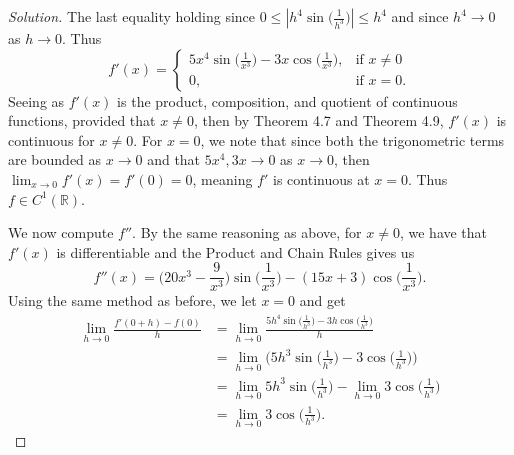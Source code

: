 \documentclass[12pt]{article}
\newenvironment{solution}
{\renewcommand\qedsymbol{$\blacksquare$}\begin{proof}[Solution]}
{\end{proof}}
\begin{document}
\begin{enumerate}
\begin{solution}
                The last equality holding since
                $0\leq|h^4\sin\big(\frac{1}{h^3}\big)|\leq h^4$ and since $h^4\to 0$
                as $h\to 0$. Thus
                \begin{equation*}
                    f'(x)=\begin{cases}
                        5x^4\sin\big(\frac{1}{x^3}\big)-3x\cos\big(\frac{1}{x^3}\big),
                        & \text{if $x\neq 0$} \\
                        0, & \text{if $x=0$}.
                    \end{cases}
                \end{equation*}
                Seeing as $f'(x)$ is the product, composition, and quotient of
                continuous functions, provided that $x\neq 0$, then by Theorem
                4.7 and Theorem 4.9, $f'(x)$ is continuous for $x\neq 0$. For
                $x=0$, we note that since both the trigonometric terms are
                bounded as $x\to 0$ and that $5x^4, 3x\to 0$ as $x\to 0$, then
                $\lim_{x\to 0}f'(x)=f'(0)=0$, meaning $f'$ is continuous at
                $x=0$. Thus $f\in C^1(\mathbb{R})$.\par\hspace{4mm} We now
                compute $f''$. By the same reasoning as above, for $x\neq 0$,
                we have that $f'(x)$ is differentiable and the Product and
                Chain Rules gives us
                \begin{equation*}
                    f''(x)=\bigg(20x^3-\frac{9}{x^3}\bigg)
                    \sin\big(\frac{1}{x^3}\big)-(15x+3)\cos\big(\frac{1}{x^3}\big).
                \end{equation*}
                Using the same method as before, we let $x=0$ and get 
                \begin{align*}
                    \lim_{h\to 0}\frac{f'(0+h)-f(0)}{h}
                    &=\lim_{h\to
                    0}\frac{5h^4\sin\big(\frac{1}{h^3}\big)-3h\cos\big(\frac{1}{h^3}\big)}{h}
                      \\
                    &=\lim_{h\to
                      0}\bigg(5h^3\sin\big(\frac{1}{h^3}\big)-3\cos\big(\frac{1}{h^3}\big)\bigg)
                        \\
                    &=\lim_{h\to 0}5h^3\sin\big(\frac{1}{h^3}\big)-\lim_{h\to
                    0}3\cos\big(\frac{1}{h^3}\big) \\
                    &=\lim_{h\to 0}3\cos\big(\frac{1}{h^3}\big).

\end{align*}
\end{solution}
\end{enumerate}
\end{document}
